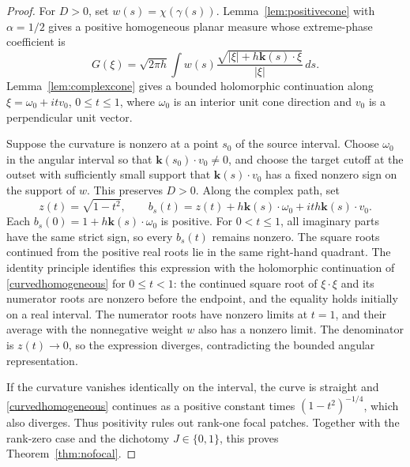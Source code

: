 \documentclass[11pt]{article}
\newcommand{\dd}{\,d}
\begin{document}
\begin{proof}
For $D>0$, set $w(s)=\chi(\gamma(s))$. Lemma~\ref{lem:positivecone} with $\alpha=1/2$ gives a positive homogeneous planar measure whose extreme-phase coefficient is
\begin{equation}\label{curvedhomogeneous}
 G(\xi)=\sqrt{2\pi h}\int w(s)
 \frac{\sqrt{|\xi|+h\mathbf k(s)\cdot\xi}}{|\xi|}\dd s.
\end{equation}
Lemma~\ref{lem:complexcone} gives a bounded holomorphic continuation along $\xi=\omega_0+itv_0$, $0\le t\le1$, where $\omega_0$ is an interior unit cone direction and $v_0$ is a perpendicular unit vector.

Suppose the curvature is nonzero at a point $s_0$ of the source interval. Choose $\omega_0$ in the angular interval so that $\mathbf k(s_0)\cdot v_0\ne0$, and choose the target cutoff at the outset with sufficiently small support that $\mathbf k(s)\cdot v_0$ has a fixed nonzero sign on the support of $w$. This preserves $D>0$. Along the complex path, set
\[
 z(t)=\sqrt{1-t^2},\qquad
 b_s(t)=z(t)+h\mathbf k(s)\cdot\omega_0
                +ith\mathbf k(s)\cdot v_0.
\]
Each $b_s(0)=1+h\mathbf k(s)\cdot\omega_0$ is positive. For $0<t\le1$, all imaginary parts have the same strict sign, so every $b_s(t)$ remains nonzero. The square roots continued from the positive real roots lie in the same right-hand quadrant. The identity principle identifies this expression with the holomorphic continuation of \eqref{curvedhomogeneous} for $0\le t<1$: the continued square root of $\xi\cdot\xi$ and its numerator roots are nonzero before the endpoint, and the equality holds initially on a real interval. The numerator roots have nonzero limits at $t=1$, and their average with the nonnegative weight $w$ also has a nonzero limit. The denominator is $z(t)\to0$, so the expression diverges, contradicting the bounded angular representation.

If the curvature vanishes identically on the interval, the curve is straight and \eqref{curvedhomogeneous} continues as a positive constant times $(1-t^2)^{-1/4}$, which also diverges. Thus positivity rules out rank-one focal patches. Together with the rank-zero case and the dichotomy $J\in\{0,1\}$, this proves Theorem~\ref{thm:nofocal}.
\end{proof}
\end{document}
